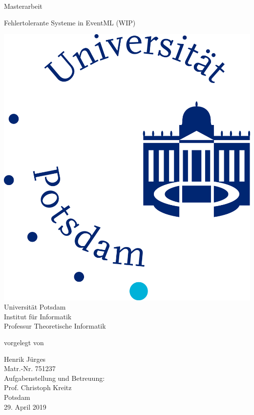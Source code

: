 \documentclass[11pt, a4paper]{article}
\begin{document}
          

\begin{titlepage}
  \begin{center} 
    \mbox{}
    
    {\large \sc Masterarbeit} \\    

    \vspace{1cm}
  
    {\huge Fehlertolerante Systeme in EventML (WIP)\\[1em] {\LARGE}}  
        
    \vspace{2cm}
    
    \includegraphics[scale=0.05]{images/Mathnatlogo.jpg}\\[1em]
    Universität Potsdam\\
    Institut für Informatik \\
    Professur Theoretische Informatik
    
    \vspace{2cm}
    
		vorgelegt von
		
    \vspace{1em}
    
		{\Large Henrik Jürges} \\
        {Matr.-Nr. 751237}\\

    \vspace{2em}
        {Aufgabenstellung und Betreuung:}\\
        {Prof. Christoph Kreitz}\\
		
    \vspace{3em}    
    Potsdam\\
    29. April 2019
  \end{center}
\end{titlepage}
\end{document}
